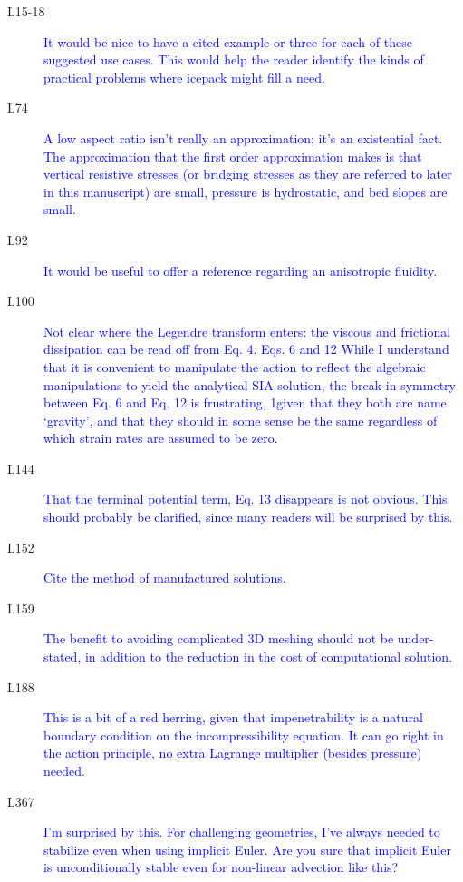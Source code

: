 \documentclass{article}
\theoremstyle{definition}
\theoremstyle{plain}
\begin{document}
\begin{description}
\item[L15-18] \textcolor{blue}{It would be nice to have a cited example or three for each of these
suggested use cases. This would help the reader identify the kinds of
practical problems where icepack might fill a need.}

\item[L74] \textcolor{blue}{A low aspect ratio isn’t really an approximation; it’s an existential fact.
The approximation that the first order approximation makes is that vertical resistive stresses (or bridging stresses as they are referred to later
in this manuscript) are small, pressure is hydrostatic, and bed slopes are
small.}

\item[L92] \textcolor{blue}{It would be useful to offer a reference regarding an anisotropic fluidity.}

\item[L100] \textcolor{blue}{Not clear where the Legendre transform enters: the viscous and frictional
dissipation can be read off from Eq. 4.
Eqs. 6 and 12 While I understand that it is convenient to manipulate the
action to reflect the algebraic manipulations to yield the analytical SIA
solution, the break in symmetry between Eq. 6 and Eq. 12 is frustrating,
1given that they both are name ‘gravity’, and that they should in some
sense be the same regardless of which strain rates are assumed to be zero.}

\item[L144] \textcolor{blue}{That the terminal potential term, Eq. 13 disappears is not obvious. This
should probably be clarified, since many readers will be surprised by this.}

\item[L152] \textcolor{blue}{Cite the method of manufactured solutions.}

\item[L159] \textcolor{blue}{The benefit to avoiding complicated 3D meshing should not be under-
stated, in addition to the reduction in the cost of computational solution.}

\item[L188] \textcolor{blue}{This is a bit of a red herring, given that impenetrability is a natural
boundary condition on the incompressibility equation. It can go right
in the action principle, no extra Lagrange multiplier (besides pressure)
needed.}

\item[L367] \textcolor{blue}{I’m surprised by this. For challenging geometries, I’ve always needed to
stabilize even when using implicit Euler. Are you sure that implicit Euler
is unconditionally stable even for non-linear advection like this?}


\end{description}
\end{document}
